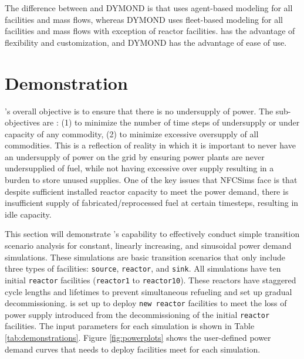 The difference between \Cyclus and DYMOND is that \Cyclus uses 
agent-based modeling for all facilities and mass flows, 
whereas DYMOND uses fleet-based modeling for all facilities and 
mass flows with exception of reactor facilities. 
\Cyclus has the advantage of flexibility and customization, 
and DYMOND has the advantage of ease of use. 

\section{\deploy Demonstration}
\label{sec:demo}
\deploy's overall objective is to ensure that there is no 
undersupply of power. 
The sub-objectives are : (1) to minimize the number of time 
steps of undersupply or under capacity of any 
commodity, (2) to minimize excessive oversupply of all commodities.
This is a reflection of reality in which it is important to 
never have an undersupply of power on the grid by ensuring power 
plants are never undersupplied of fuel, while not 
having excessive over supply resulting in a burden to store unused 
supplies. 
One of the key issues that \gls{NFCSim}s face is that despite
sufficient installed reactor capacity to meet the power 
demand, there is insufficient supply of fabricated/reprocessed 
fuel at certain timesteps, resulting in idle capacity.  

This section will demonstrate \deploy's capability 
to effectively conduct simple transition scenario analysis
for constant, linearly increasing, and 
sinusoidal power demand simulations.
These simulations are basic transition scenarios that only include 
three types of facilities: \texttt{source}, \texttt{reactor}, and 
\texttt{sink}. 
All simulations have ten initial \texttt{reactor} facilities 
(\texttt{reactor1} to \texttt{reactor10}). 
These reactors have staggered cycle lengths and lifetimes to prevent 
simultaneous refueling and set up gradual decommissioning. 
\deploy is set up to deploy \texttt{new reactor} facilities
to meet the loss of power supply introduced from the decommissioning 
of the initial \texttt{reactor} facilities. 
The \deploy input parameters for each simulation is shown in Table 
\ref{tab:demonstrations}. 
Figure \ref{fig:powerplots} shows the user-defined power demand curves 
that \deploy needs to deploy facilities meet for each simulation.

